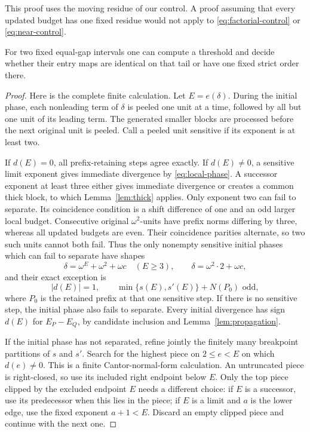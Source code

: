 This proof uses the moving residue of our control. A proof assuming that
every updated budget has one fixed residue would not apply to
\eqref{eq:factorial-control} or \eqref{eq:near-control}.

\begin{proposition}\label{prop:equal-gap}
For two fixed equal-gap intervals one can compute a threshold and decide
whether their entry maps are identical on that tail or have one fixed
strict order there.
\end{proposition}
\begin{proof}
Here is the complete finite calculation. Let \(E=e(\delta)\).
During the initial phase, each nonleading term of \(\delta\) is
peeled one unit at a time, followed by all but one unit of its leading
term. The generated smaller blocks are processed before the next
original unit is peeled. Call a peeled unit sensitive if its exponent
is at least two.

If \(d(E)=0\), all prefix-retaining steps agree exactly. If
\(d(E)\ne0\), a sensitive limit exponent gives immediate divergence
by \eqref{eq:local-phase}. A successor exponent at least three either
gives immediate divergence or creates a common thick block, to which
Lemma~\ref{lem:thick} applies. Only exponent two can fail to separate.
Its coincidence condition is a shift difference of one and an odd larger
local budget. Consecutive original \(\omega^2\)-units have prefix
norms differing by three, whereas all updated budgets are even. Their
coincidence parities alternate, so two such units cannot both fail.
Thus the only nonempty sensitive initial phases which can fail to
separate have shapes
\[
 \delta=\omega^E+\omega^2+\omega c\quad(E\ge3),\qquad
 \delta=\omega^2\cdot2+\omega c,
\]
and their exact exception is
\[
 |d(E)|=1,\qquad \min\{s(E),s'(E)\}+N(P_0)\text{ odd},
\]
where \(P_0\) is the retained prefix at that one sensitive step.
If there is no sensitive step, the initial phase also fails to separate.
Every initial divergence has sign \(d(E)\) for \(E_P-E_Q\), by
candidate inclusion and Lemma~\ref{lem:propagation}.

If the initial phase has not separated, refine jointly the finitely many
breakpoint partitions of \(s\) and \(s'\). Search for the highest
piece on \(2\le e<E\) on which \(d(e)\ne0\). This is a finite
Cantor-normal-form calculation. An untruncated piece is right-closed,
so use its included right endpoint below \(E\). Only the top piece
clipped by the excluded endpoint \(E\) needs a different choice:
if \(E\) is a successor, use its predecessor when this lies in the piece;
if \(E\) is a limit and \(a\) is the lower edge, use the fixed exponent
\(a+1<E\). Discard an empty clipped piece and continue with the next one.


\end{proof}
